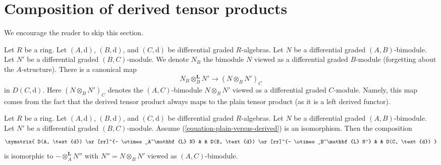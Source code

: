 \section{Composition of derived tensor products}
\label{section-compose-tensor-functors}

\noindent
We encourage the reader to skip this section.

\medskip\noindent
Let $R$ be a ring. Let $(A, \text{d})$, $(B, \text{d})$, and
$(C, \text{d})$ be differential graded $R$-algebras.
Let $N$ be a differential graded $(A, B)$-bimodule.
Let $N'$ be a differential graded $(B, C)$-module.
We denote $N_B$ the bimodule $N$ viewed as a differential graded
$B$-module (forgetting about the $A$-structure). There is a canonical map
\begin{equation}
\label{equation-plain-versus-derived}
N_B \otimes_B^\mathbf{L} N'
\longrightarrow
(N \otimes_B N')_C
\end{equation}
in $D(C, \text{d})$. Here $(N \otimes_B N')_C$ denotes the
$(A, C)$-bimodule $N \otimes_B N'$ viewed as a
differential graded $C$-module. Namely, this map
comes from the fact that the derived tensor product always maps to the
plain tensor product (as it is a left derived functor).

\begin{lemma}
\label{lemma-compose-tensor-functors-general}
Let $R$ be a ring. Let $(A, \text{d})$, $(B, \text{d})$, and
$(C, \text{d})$ be differential graded $R$-algebras.
Let $N$ be a differential graded $(A, B)$-bimodule.
Let $N'$ be a differential graded $(B, C)$-module.
Assume (\ref{equation-plain-versus-derived}) is an isomorphism.
Then the composition
$$
\xymatrix{
D(A, \text{d}) \ar[rr]^{- \otimes_A^\mathbf{L} N} & &
D(B, \text{d}) \ar[rr]^{- \otimes_B^\mathbf{L} N'} & &
D(C, \text{d})
}
$$
is isomorphic to $- \otimes_A^\mathbf{L} N''$ with
$N'' = N \otimes_B N'$ viewed as $(A, C)$-bimodule.
\end{lemma}

